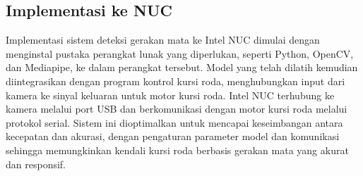 \subsection{Implementasi ke NUC}

Implementasi sistem deteksi gerakan mata ke Intel NUC dimulai dengan menginstal pustaka perangkat lunak yang diperlukan, seperti Python, OpenCV, dan Mediapipe, ke dalam perangkat tersebut. Model yang telah dilatih kemudian diintegrasikan dengan program kontrol kursi roda, menghubungkan input dari kamera ke sinyal keluaran untuk motor kursi roda. Intel NUC terhubung ke kamera melalui port USB dan berkomunikasi dengan motor kursi roda melalui protokol serial. Sistem ini dioptimalkan untuk mencapai keseimbangan antara kecepatan dan akurasi, dengan pengaturan parameter model dan komunikasi sehingga memungkinkan kendali kursi roda berbasis gerakan mata yang akurat dan responsif.